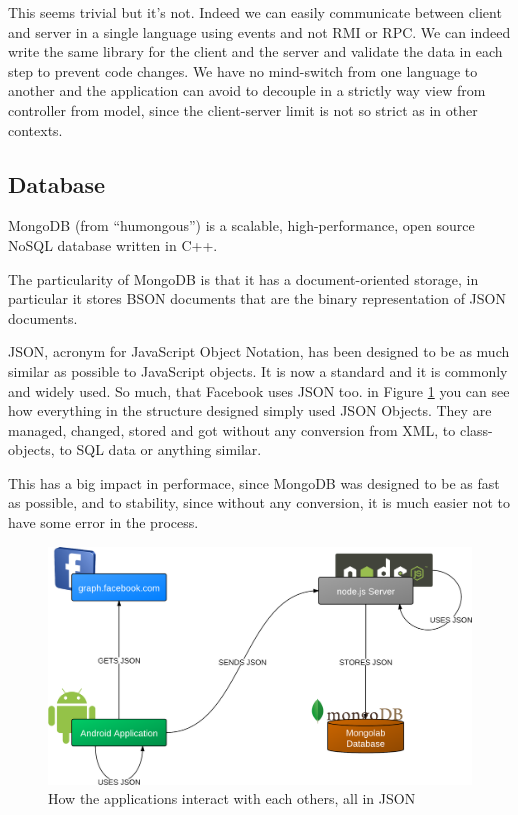 This seems trivial but it's not. Indeed we can easily communicate between client and server in a single language using events and not RMI or RPC. We can indeed write the same library for the client and the server and validate the data in each step to prevent code changes. We have no mind-switch from one language to another and the application can avoid to decouple in a strictly way view from controller from model, since the client-server limit is not so strict as in other contexts.

\subsection{Database}

MongoDB (from ``humongous'') is a scalable, high-performance, open source NoSQL database written in C++.

The particularity of MongoDB is that it has a document-oriented storage, in particular it stores BSON documents that are the binary representation of JSON documents.

JSON, acronym for JavaScript Object Notation, has been designed to be as much similar as possible to JavaScript objects. It is now a standard and it is commonly and widely used. So much, that Facebook uses JSON too. in Figure \ref{fig:JSONTrip} you can see how everything in the structure designed simply used JSON Objects. They are managed, changed, stored and got without any conversion from XML, to class-objects, to SQL data or anything similar.

This has a big impact in performace, since MongoDB was designed to be as fast as possible, and to stability, since without any conversion, it is much easier not to have some error in the process.

\begin{figure}[H]
\centering %
\includegraphics[width=\textwidth]{img/JSONTrip.png}
\caption{How the applications interact with each others, all in JSON}
\label{fig:JSONTrip}
\end{figure}

